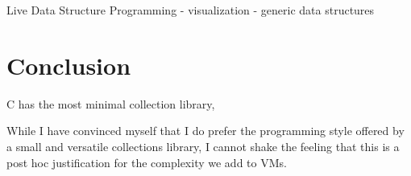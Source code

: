 \documentclass[sigconf, 10pt]{acmart}
\begin{document}
Live Data Structure Programming \citep{Oka:2017:LDS}
- visualization
- generic data structures

\section{Conclusion}

C has the most minimal collection library, 


While I have convinced myself
that I do prefer the programming style offered
by a small and versatile collections library,
I cannot shake the feeling
that this is a post hoc justification
for the complexity we add to VMs.






\end{document}
